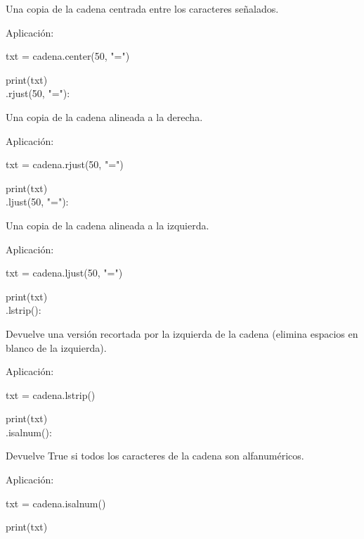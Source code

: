 {{\begin{minipage}{14cm}
{{					{ \color{blue} Una copia de la cadena centrada entre los caracteres señalados. }	
					
					Aplicación: 
					
					txt = cadena.center(50, "{}=")  
					
					{\color{red!70!blue}print}(txt)\\
					
					
					
					.rjust(50, "{}="):  
					
					{ \color{blue}Una copia de la cadena alineada a la derecha. }	
					
					Aplicación: 
					
					txt = cadena.rjust(50, "{}=")  
					
					{\color{red!70!blue}print}(txt)\\
					
					
					
					.ljust(50, "{}="): 
					
					{ \color{blue} Una copia de la cadena alineada a la izquierda. }	
					
					Aplicación: 
					
					txt = cadena.ljust(50, "{}=")  
					
					{\color{red!70!blue}print}(txt)\\
					
					
					.lstrip():  
					
					{ \color{blue}Devuelve una versión recortada por la izquierda de la cadena (elimina espacios en blanco de la izquierda).}
					
					Aplicación: 
					
					txt = cadena.lstrip()
					
					{\color{red!70!blue}print}(txt)\\
					
					
					
					
					.isalnum():  
					
					{ \color{blue}Devuelve True si todos los caracteres de la cadena son alfanuméricos.}	
					
					Aplicación: 
					
					txt = cadena.isalnum()
					
					{\color{red!70!blue}print}(txt)\\
					
					
					
			}}
		\end{minipage} 
} }

















